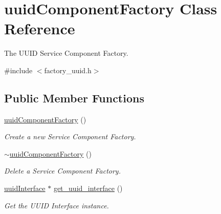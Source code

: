 \hypertarget{classuuidComponentFactory}{}\section{uuid\+Component\+Factory Class Reference}
\label{classuuidComponentFactory}


The U\+U\+ID Service Component Factory.  




{\ttfamily \#include $<$factory\+\_\+uuid.\+h$>$}

\subsection*{Public Member Functions}
\begin{DoxyCompactItemize}
\item 
\hyperlink{classuuidComponentFactory_a6dc50b685a22da9b64b137de800365f4}{uuid\+Component\+Factory} ()\hypertarget{classuuidComponentFactory_a6dc50b685a22da9b64b137de800365f4}{}\label{classuuidComponentFactory_a6dc50b685a22da9b64b137de800365f4}

\begin{DoxyCompactList}\small\item\em Create a new Service Component Factory. \end{DoxyCompactList}\item 
\hyperlink{classuuidComponentFactory_a64f6dccee4aa0f93ee322d2541bb8103}{$\sim$uuid\+Component\+Factory} ()\hypertarget{classuuidComponentFactory_a64f6dccee4aa0f93ee322d2541bb8103}{}\label{classuuidComponentFactory_a64f6dccee4aa0f93ee322d2541bb8103}

\begin{DoxyCompactList}\small\item\em Delete a Service Component Factory. \end{DoxyCompactList}\item 
\hyperlink{classuuidInterface}{uuid\+Interface} $\ast$ \hyperlink{classuuidComponentFactory_a50e1f856aa001a732a324370983ca236}{get\+\_\+uuid\+\_\+interface} ()\hypertarget{classuuidComponentFactory_a50e1f856aa001a732a324370983ca236}{}\label{classuuidComponentFactory_a50e1f856aa001a732a324370983ca236}

\begin{DoxyCompactList}\small\item\em Get the U\+U\+ID Interface instance. \end{DoxyCompactList}\end{DoxyCompactItemize}


